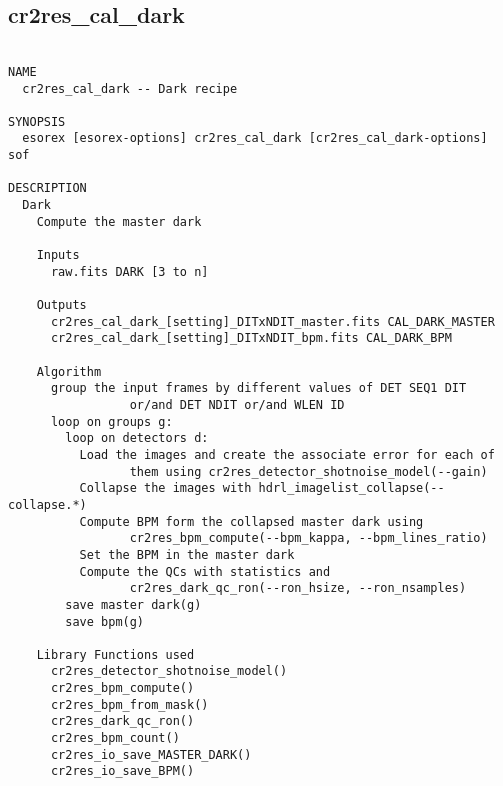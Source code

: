 \subsection{cr2res\_cal\_dark}
\begin{verbatim}

NAME
  cr2res_cal_dark -- Dark recipe

SYNOPSIS
  esorex [esorex-options] cr2res_cal_dark [cr2res_cal_dark-options] sof

DESCRIPTION
  Dark                                                                    
    Compute the master dark                                               
                                                                          
    Inputs                                                                
      raw.fits DARK [3 to n]                               
                                                                          
    Outputs                                                               
      cr2res_cal_dark_[setting]_DITxNDIT_master.fits CAL_DARK_MASTER
      cr2res_cal_dark_[setting]_DITxNDIT_bpm.fits CAL_DARK_BPM
                                                                          
    Algorithm                                                             
      group the input frames by different values of DET SEQ1 DIT          
                 or/and DET NDIT or/and WLEN ID                           
      loop on groups g:                                                   
        loop on detectors d:                                              
          Load the images and create the associate error for each of      
                 them using cr2res_detector_shotnoise_model(--gain)       
          Collapse the images with hdrl_imagelist_collapse(--collapse.*)  
          Compute BPM form the collapsed master dark using                
                 cr2res_bpm_compute(--bpm_kappa, --bpm_lines_ratio)       
          Set the BPM in the master dark                                  
          Compute the QCs with statistics and                             
                 cr2res_dark_qc_ron(--ron_hsize, --ron_nsamples)          
        save master dark(g)                                               
        save bpm(g)                                                       
                                                                          
    Library Functions used                                                
      cr2res_detector_shotnoise_model()                                   
      cr2res_bpm_compute()                                                
      cr2res_bpm_from_mask()                                              
      cr2res_dark_qc_ron()                                                
      cr2res_bpm_count()                                                  
      cr2res_io_save_MASTER_DARK()                                        
      cr2res_io_save_BPM()                                                
  


\end{verbatim}
